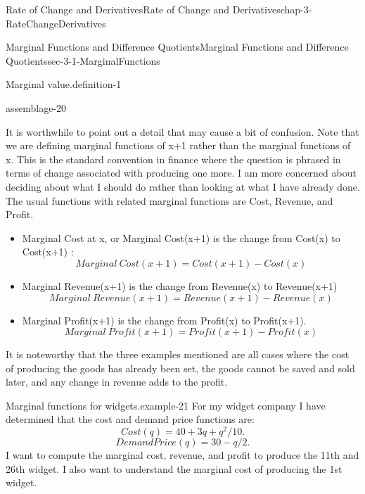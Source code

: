 \documentclass[oneside,10pt,]{book}
\numberwithin{equation}{section}
\begin{document}
\begin{chapterptx}{Rate of Change and Derivatives}{}{Rate of Change and Derivatives}{}{}{chap-3-RateChangeDerivatives}
\begin{sectionptx}{Marginal Functions and Difference Quotients}{}{Marginal Functions and Difference Quotients}{}{}{sec-3-1-MarginalFunctions}
\begin{definition}{Marginal value.}{definition-1}
\begin{assemblage}{}{assemblage-20}
%
\end{assemblage}
\end{definition}
\hypertarget{p-903}{}%
It is worthwhile to point out a detail that may cause a bit of confusion.  Note that we are defining marginal functions of x+1 rather than the marginal functions of x.  This is the standard convention in finance where the question is phrased in terms of change associated with producing one more.  I am more concerned about deciding about what I should do rather than looking at what I have already done. The usual functions with related marginal functions are Cost, Revenue, and Profit.%
\leavevmode%
\begin{itemize}[label=\textbullet]
\item{}\hypertarget{p-904}{}%
Marginal Cost at x, or Marginal Cost(x+1) is the change from Cost(x) to Cost(x+1) :%
\begin{equation*}
Marginal\ Cost(x+1)=Cost(x+1)-Cost(x)
\end{equation*}
%
\item{}\hypertarget{p-905}{}%
Marginal Revenue(x+1) is the change from Revenue(x) to Revenue(x+1)%
\begin{equation*}
Marginal\ Revenue(x+1)=Revenue(x+1)-Revenue(x)
\end{equation*}
%
\item{}\hypertarget{p-906}{}%
Marginal Profit(x+1) is the change from Profit(x) to Profit(x+1).%
\begin{equation*}
Marginal\ Profit(x+1)=Profit(x+1)-Profit(x)
\end{equation*}
%
\end{itemize}
\hypertarget{p-907}{}%
It is noteworthy that the three examples mentioned are all cases where the cost of producing the goods has already been set, the goods cannot be saved and sold later, and any change in revenue adds to the profit.%
\begin{example}{Marginal functions for widgets.}{example-21}%
\hypertarget{p-908}{}%
For my widget company I have determined that the cost and demand price functions are:%
%
\begin{equation*}
Cost(q)=40+3q+q^2/10.
\end{equation*}
%
\begin{equation*}
DemandPrice(q)=30-q/2.
\end{equation*}
\hypertarget{p-909}{}%
I want to compute the marginal cost, revenue, and profit to produce the 11th and 26th widget.  I also want to understand the marginal cost of producing the 1st widget.%
\par

\end{example}
\end{sectionptx}
\end{chapterptx}
\end{document}
